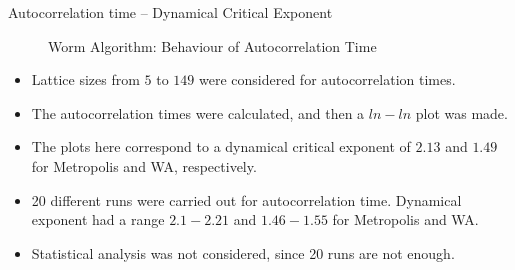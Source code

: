 \documentclass{beamer}
\begin{document}
\begin{frame}{Autocorrelation time – Dynamical Critical Exponent}
\begin{figure}[htbp]
\begin{center}
\begin{minipage}[t]{0.49\linewidth}
		  \caption{Worm Algorithm: Behaviour of Autocorrelation Time}
        \end{minipage}
	\end{center}
    \end{figure}
\end{frame}

\begin{frame}
\begin{itemize}
    \item Lattice sizes from $5$ to $149$ were considered for autocorrelation times.
    \item The autocorrelation times were calculated, and then a $ln-ln$ plot was made.
    \item The plots here correspond to a dynamical critical exponent of $2.13$ and $1.49$ for Metropolis and WA, respectively.
    \item 20 different runs were carried out for autocorrelation time. Dynamical exponent had a range $2.1-2.21$ and $1.46-1.55$ for Metropolis and WA.
    \item Statistical analysis was not considered, since 20 runs are not enough.
\end{itemize}
\end{frame}
\end{document}
